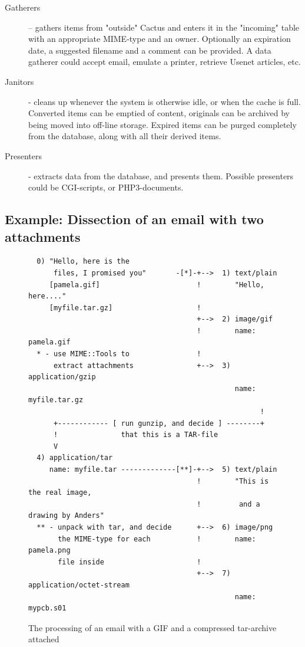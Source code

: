 \begin{description}
\item[Gatherers] -- gathers items from "outside" Cactus and
  enters it in the "incoming" table with an appropriate
  MIME-type and an owner.  Optionally an expiration date, a
  suggested filename and a comment can be provided. A
  data gatherer could accept email, emulate a printer, retrieve
  Usenet articles, etc.

\item[Janitors] - cleans up whenever the system is otherwise
  idle, or when the cache is full.  Converted items can be
  emptied of content, originals can be archived by being
  moved into off-line storage.  Expired items can be purged
  completely from the database, along with all their derived
  items.

\item[Presenters] - extracts data from the database, and
  presents them.  Possible presenters could be CGI-scripts,
  or  PHP3-documents.

\end{description}


\subsection{Example: Dissection of an email with two attachments}

\begin{figure}[htbp]
  \begin{center}
\begin{verbatim}
  0) "Hello, here is the
      files, I promised you"       -[*]-+-->  1) text/plain
     [pamela.gif]                       !        "Hello, here...."
     [myfile.tar.gz]                    !
                                        +-->  2) image/gif
                                        !        name:  pamela.gif
  * - use MIME::Tools to                !
      extract attachments               +-->  3) application/gzip
                                                 name:  myfile.tar.gz
                                                       !
      +------------ [ run gunzip, and decide ] --------+
      !               that this is a TAR-file
      V
  4) application/tar
     name: myfile.tar -------------[**]-+-->  5) text/plain
                                        !        "This is the real image,
                                        !         and a drawing by Anders"
  ** - unpack with tar, and decide      +-->  6) image/png
       the MIME-type for each           !        name: pamela.png
       file inside                      !
                                        +-->  7) application/octet-stream
                                                 name: mypcb.s01
\end{verbatim}
    \caption{The processing of an email with a GIF and a compressed tar-archive attached}
    \label{fig:xexample}
  \end{center}
\end{figure}


